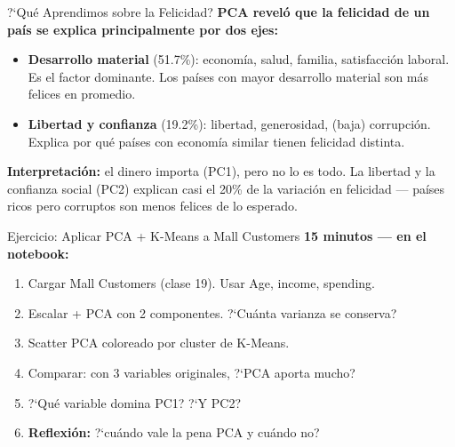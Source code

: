 \documentclass[aspectratio=169, 11pt]{beamer}
\begin{document}
\begin{frame}{?`Qu\'e Aprendimos sobre la Felicidad?}
  \vspace{-4pt}
  {\footnotesize\color{arcaDark}\bfseries
    PCA revel\'o que la felicidad de un pa\'is se explica principalmente
    por dos ejes:}

  \vspace{6pt}
  {\footnotesize
  \begin{itemize}\setlength{\itemsep}{5pt}
    \item[{\color{codeBlue}\bfseries PC1}]
      \textbf{Desarrollo material} (51.7\%): econom\'ia, salud, familia,
      satisfacci\'on laboral. Es el factor dominante. Los pa\'ises con
      mayor desarrollo material son m\'as felices en promedio.
    \item[{\color{codePurple}\bfseries PC2}]
      \textbf{Libertad y confianza} (19.2\%): libertad, generosidad,
      (baja) corrupci\'on. Explica por qu\'e pa\'ises con econom\'ia
      similar tienen felicidad distinta.
  \end{itemize}
  }

  \vspace{6pt}
  \begin{tcolorbox}[colback=arcaGray, colframe=arcaRed, boxrule=0.5pt, arc=2pt,
    left=6pt, right=6pt, top=4pt, bottom=4pt]
    {\scriptsize\color{arcaDark}
    \faKey\hspace{4pt}\textbf{Interpretaci\'on:} el dinero importa (PC1),
    pero no lo es todo. La libertad y la confianza social (PC2)
    explican casi el 20\% de la variaci\'on en felicidad ---
    pa\'ises ricos pero corruptos son menos felices de lo esperado.}
  \end{tcolorbox}
\end{frame}

\begin{frame}[shrink=5]{Ejercicio: Aplicar PCA + K-Means a Mall Customers}
  \vspace{-4pt}
  {\footnotesize\color{arcaDark}\bfseries
    \faClock\hspace{4pt} 15 minutos --- en el notebook:}

  \vspace{6pt}
  {\footnotesize
  \begin{enumerate}\setlength{\itemsep}{4pt}
    \item Cargar Mall Customers (clase 19). Usar Age, income, spending.
    \item Escalar + PCA con 2 componentes. ?`Cu\'anta varianza se conserva?
    \item Scatter PCA coloreado por cluster de K-Means.
    \item Comparar: con 3 variables originales, ?`PCA aporta mucho?
    \item ?`Qu\'e variable domina PC1? ?`Y PC2?
    \item \textbf{Reflexi\'on:} ?`cu\'ando vale la pena PCA y cu\'ando no?
  \end{enumerate}
  }
\end{frame}
\end{document}
